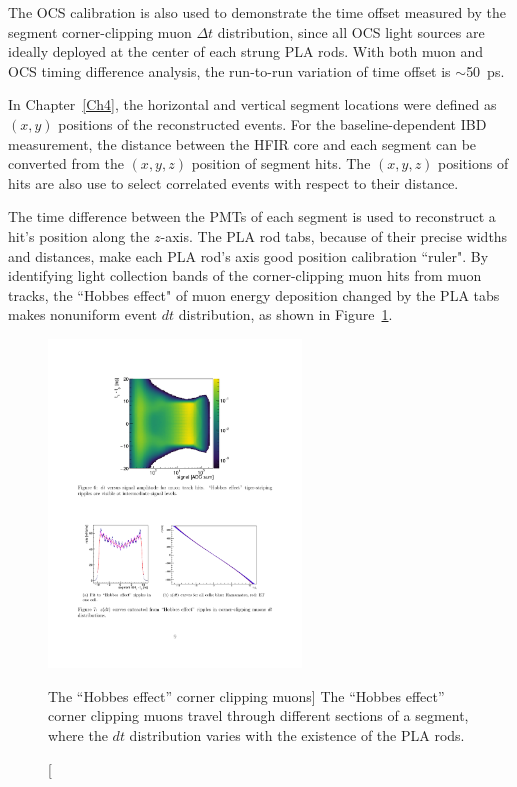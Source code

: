 The OCS calibration is also used to demonstrate the time offset measured by the segment corner-clipping muon $\Delta t$ distribution, since all OCS light sources are ideally deployed at the center of each strung PLA rods. 
With both muon and OCS timing difference analysis, the run-to-run variation of time offset is $\sim$50~ps.


In Chapter~\ref{Ch4}, the horizontal and vertical segment locations were defined as $(x, y)$ positions of the reconstructed events.
For the baseline-dependent IBD measurement, the distance between the HFIR core and each segment can be converted from the $(x, y, z)$ position of segment hits.
The $(x, y, z)$ positions of hits are also use to select correlated events with respect to their distance.

The time difference between the PMTs of each segment is used to reconstruct a hit's position along the $z$-axis.
The PLA rod tabs, because of their precise widths and distances, make each PLA rod's axis good position calibration ``ruler".
By identifying light collection bands of the corner-clipping muon hits from muon tracks, the ``Hobbes effect" of muon energy deposition changed by the PLA tabs makes nonuniform event $dt$ distribution, as shown in Figure~\ref{fig:Tiger}.
\begin{figure}[ht]
\centering
\includegraphics[width=0.6\textwidth]{Figures/TigerStrips.pdf}
\caption[The ``Hobbes effect” corner clipping muons]{
The ``Hobbes effect” corner clipping muons travel through different sections of a segment, where the $dt$ distribution varies with the existence of the PLA rods.
}
\label{fig:Tiger}
\end{figure}

